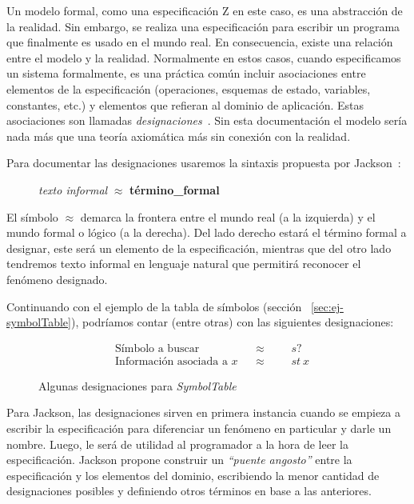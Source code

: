 Un modelo formal, como una especificación Z en este caso, es una abstracción de la realidad. Sin embargo, se realiza una especificación para escribir un programa que finalmente es usado en el mundo real. En consecuencia, existe una relación entre el modelo y la realidad.
Normalmente en estos casos, cuando especificamos un sistema formalmente, es una práctica común incluir asociaciones entre elementos de la especificación (operaciones, esquemas de estado, variables, constantes, etc.) y elementos que refieran al dominio de aplicación. Estas asociaciones son llamadas \emph{designaciones}~\cite{jackson}.
Sin esta documentación el modelo sería nada más que una teoría axiomática más sin conexión con la realidad. 

Para documentar las designaciones usaremos la sintaxis propuesta por Jackson~\cite{jackson}:

\begin{figure}[H]
  \centering
  \emph{texto informal} $\approx$ \textbf{término\_formal}
\end{figure}

El símbolo $\approx$ demarca la frontera entre el mundo real (a la izquierda) y el mundo formal o lógico (a la derecha). Del lado derecho estará el término formal a designar, este será un elemento de la especificación, mientras que del otro lado tendremos texto informal en lenguaje natural que permitirá reconocer el fenómeno designado.

Continuando con el ejemplo de la tabla de símbolos (sección ~\ref{sec:ej-symbolTable}), podríamos contar (entre otras) con las siguientes designaciones:

\begin{figure}[H]
  \begin{align*} 
    &\text{Símbolo a buscar} && \approx &&&s? \\
    &\text{Información asociada a $x$} && \approx &&&st~x
  \end{align*}
  \caption{Algunas designaciones para \emph{SymbolTable}}
  \label{fig:ej_designacion}
\end{figure}


Para Jackson, las designaciones sirven en primera instancia cuando se empieza a escribir la especificación para diferenciar un fenómeno en particular y darle un nombre. Luego, le será de utilidad al programador a la hora de leer la especificación. Jackson propone construir un \emph{``puente angosto''} entre la especificación y los elementos del dominio, escribiendo la menor cantidad de designaciones posibles y definiendo otros términos en base a las anteriores.


